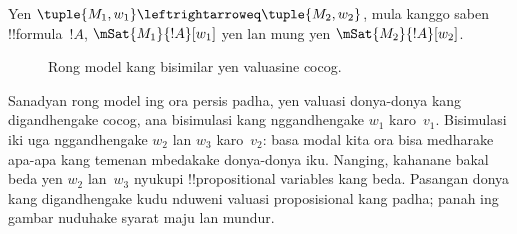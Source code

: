 \documentclass[../../../include/open-logic-section]{subfiles}
\begin{document}
\begin{thm}
Yen $\tuple{M_1, w_1} \leftrightarroweq \tuple{M_2, w_2}$, mula kanggo
saben !!{formula}~$!A$, $\mSat{M_1}{!A}[w_1]$ yen lan mung yen
$\mSat{M_2}{!A}[w_2]$.
\end{thm}

\begin{figure}
  \begin{center}
  \end{center}
  \caption{Rong model kang bisimilar yen valuasine cocog.}
\end{figure}

Sanadyan rong model ing  ora persis padha,
yen valuasi donya-donya kang digandhengake cocog, ana bisimulasi
kang nggandhengake $w_1$ karo~$v_1$. Bisimulasi iki uga nggandhengake
$w_2$ lan $w_3$ karo~$v_2$: basa modal kita ora bisa medharake
apa-apa kang temenan mbedakake donya-donya iku. Nanging, kahanane
bakal beda yen $w_2$ lan~$w_3$ nyukupi !!{propositional variable}s
kang beda.
Pasangan donya kang digandhengake kudu nduweni valuasi proposisional kang padha; panah ing gambar nuduhake syarat maju lan mundur.
\end{document}
